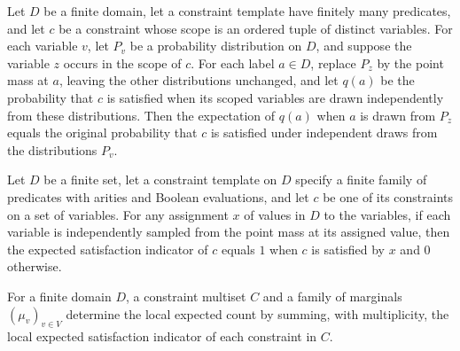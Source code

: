 \begin{theorem}
\label{FABL.CSPConstraint.average_localExpectedIndicator_replace}
\leanok
{}
Let $D$ be a finite domain, let a constraint template have finitely many predicates, and
let $c$ be a constraint whose scope is an ordered tuple of distinct variables. For each
variable $v$, let $P_v$ be a probability distribution on $D$, and suppose the variable
$z$ occurs in the scope of $c$. For each label $a\in D$, replace $P_z$ by the point mass
at $a$, leaving the other distributions unchanged, and let $q(a)$ be the probability
that $c$ is satisfied when its scoped variables are drawn independently from these
distributions. Then the expectation of $q(a)$ when $a$ is drawn from $P_z$ equals the
original probability that $c$ is satisfied under independent draws from the
distributions $P_v$.
\end{theorem}

\begin{theorem}
\label{FABL.CSPConstraint.localExpectedIndicator_pure}
\leanok
{}
Let $D$ be a finite set, let a constraint template on $D$ specify a finite family of
predicates with arities and Boolean evaluations, and let $c$ be one of its constraints
on a set of variables. For any assignment $x$ of values in $D$ to the variables, if each
variable is independently sampled from the point mass at its assigned value, then the
expected satisfaction indicator of $c$ equals $1$ when $c$ is satisfied by $x$ and $0$
otherwise.
\end{theorem}

\begin{definition}
\label{FABL.CSPInstance.localExpectedCount}
\leanok
{}
For a finite domain $D$, a constraint multiset $C$ and a family of marginals
$(\mu_v)_{v\in V}$ determine the local expected count by summing, with multiplicity, the
local expected satisfaction indicator of each constraint in $C$.
\end{definition}

